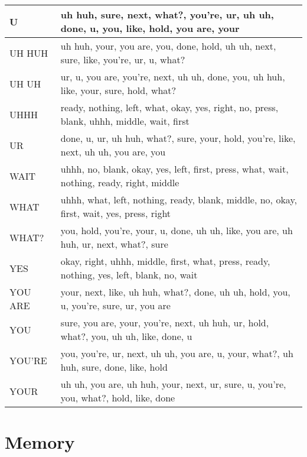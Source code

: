 \documentclass[]{article}
\begin{document}
\begin{tabular}{|l|l|}
\hline \rule[-2ex]{0pt}{5.5ex}  U		& uh huh, sure, next, what?, you're, ur, uh uh, done, u, you, like, hold, you are, your \\
\hline \rule[-2ex]{0pt}{5.5ex}  UH HUH	& uh huh, your, you are, you, done, hold, uh uh, next, sure, like, you're, ur, u, what? \\
\hline \rule[-2ex]{0pt}{5.5ex}  UH UH	& ur, u, you are, you're, next, uh uh, done, you, uh huh, like, your, sure, hold, what? \\
\hline \rule[-2ex]{0pt}{5.5ex}  UHHH	& ready, nothing, left, what, okay, yes, right, no, press, blank, uhhh, middle, wait, first \\
\hline \rule[-2ex]{0pt}{5.5ex}  UR		& done, u, ur, uh huh, what?, sure, your, hold, you're, like, next, uh uh, you are, you \\
\hline \rule[-2ex]{0pt}{5.5ex}  WAIT	& uhhh, no, blank, okay, yes, left, first, press, what, wait, nothing, ready, right, middle \\
\hline \rule[-2ex]{0pt}{5.5ex}  WHAT	& uhhh, what, left, nothing, ready, blank, middle, no, okay, first, wait, yes, press, right \\
\hline \rule[-2ex]{0pt}{5.5ex}  WHAT?	& you, hold, you're, your, u, done, uh uh, like, you are, uh huh, ur, next, what?, sure \\
\hline \rule[-2ex]{0pt}{5.5ex}  YES		& okay, right, uhhh, middle, first, what, press, ready, nothing, yes, left, blank, no, wait \\
\hline \rule[-2ex]{0pt}{5.5ex}  YOU ARE	& your, next, like, uh huh, what?, done, uh uh, hold, you, u, you're, sure, ur, you are \\
\hline \rule[-2ex]{0pt}{5.5ex}  YOU		& sure, you are, your, you're, next, uh huh, ur, hold, what?, you, uh uh, like, done, u \\
\hline \rule[-2ex]{0pt}{5.5ex}  YOU'RE	& you, you're, ur, next, uh uh, you are, u, your, what?, uh huh, sure, done, like, hold \\
\hline \rule[-2ex]{0pt}{5.5ex}  YOUR	& uh uh, you are, uh huh, your, next, ur, sure, u, you're, you, what?, hold, like, done\\
	\hline 
\end{tabular} 

\restoregeometry
\section{Memory}
\end{document}
